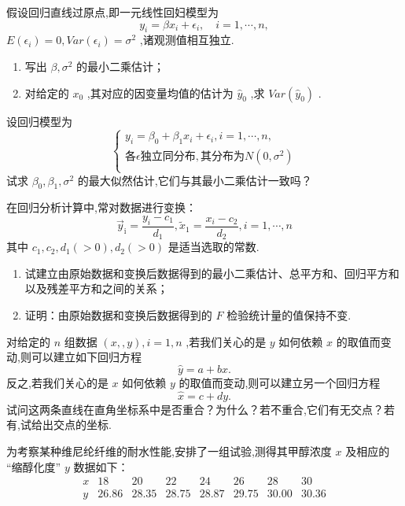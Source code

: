 \begin{xiti}
	\item 假设回归直线过原点,即一元线性回妇模型为 
	\[
	y_i=\beta x_i+\epsilon_i,\quad i=1,\cdots ,n,
	\]
	$ E(\epsilon_i)=0,Var(\epsilon_i)=\sigma^2 $ ,诸观测值相互独立.
	\begin{enumerate}
		\item 写出 $ \beta,\sigma^2 $ 的最小二乘估计；
		\item 对给定的 $ x_0 $ ,其对应的因变量均值的估计为 $ \hat{y}_0 $ ,求 $ Var(\hat{y}_0) $ .
	\end{enumerate}
	\item 设回归模型为
	\[
	\left\{ \begin{array}{l}
	y_i=\beta _0+\beta _1x_i+\epsilon _i,i=1,\cdots ,n,\\
	\text{各}\epsilon\text{独立同分布} ,\text{其分布为}N\left( 0,\sigma ^2 \right)\\
	\end{array} \right. 
	\]
	试求 $ \beta_0,\beta_1,\sigma^2 $ 的最大似然估计,它们与其最小二乘估计一致吗？
	\item 在回归分析计算中,常对数据进行变换：
	\[
	\vec{y}_{\mathrm{i}}=\frac{y_{i}-c_{1}}{d_{1}}, \tilde{x}_{1}=\frac{x_{i}-c_{2}}{d_{2}}, i=1, \cdots, n
	\]
	其中 $ c_1,c_2,d_1(>0),d_2(>0) $ 是适当选取的常数.
	\begin{enumerate}
		\item 试建立由原始数据和变换后数据得到的最小二乘估计、总平方和、回归平方和以及残差平方和之间的关系；
		\item 证明：由原始数据和变换后数据得到的 $ F $ 检验统计量的值保持不变.
	\end{enumerate}
	\item 对给定的 $ n $ 组数据 $ (x,,y),i=1,n $ ,若我们关心的是 $ y $ 如何依赖 $ x $ 的取值而变动,则可以建立如下回归方程\[
	\hat{y}=a+bx.
	\]
	反之,若我们关心的是 $ x $ 如何依赖 $ y $ 的取值而变动,则可以建立另一个回归方程
	\[
	\hat{x}=c+dy.
	\]
	试问这两条直线在直角坐标系中是否重合？为什么？若不重合,它们有无交点？若有,试给出交点的坐标.
	\item 为考察某种维尼纶纤维的耐水性能,安排了一组试验,测得其甲醇浓度 $ x $ 及相应的
	“缩醇化度” $ y $ 数据如下：
	\[
	\begin{array}{c|ccccccc}
	x     & 18    & 20    & 22    & 24    & 26    & 28    & 30 \\\hline
	y     & 26.86  & 28.35  & 28.75  & 28.87  & 29.75  & 30.00  & 30.36  \\
	\end{array}%
\]
\end{xiti}
